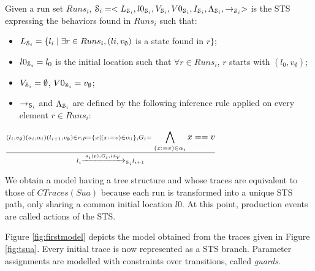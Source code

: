 \begin{definition}
  Given a run set $Runs_i$, $\EuScript{S}_i=<L_{\EuScript{S}_i},
  l0_{\EuScript{S}_i},V_{\EuScript{S}_i}, V0_{\EuScript{S}_i},
  I_{\EuScript{S}_i},\\
  \Lambda_{\EuScript{S}_i},\rightarrow_{\EuScript{S}_i}>$ is the
  STS expressing the behaviors found in $Runs_i$ such that:

	\begin{itemize}
    \item $L_{\EuScript{S}_i}= \{l_i \mid \exists r\in Runs_i,
      (li,v_\emptyset)$ is a state found in $r\}$;

    \item $l0_{\EuScript{S}_i} = l_0$ is the initial location
      such that $\forall r \in Runs_i$, $r$ starts with
      $(l_0,v_\emptyset)$;

    \item $V_{\EuScript{S}_i}=\emptyset$, $V0_{\EuScript{S}_i}=v_\emptyset$;

    \item $\rightarrow_{\EuScript{S}_i}$ and
      $\Lambda_{\EuScript{S}_i}$ are defined by the following
      inference rule applied on every element $r\in Runs_i$:
	\end{itemize}

  \begin{center}
    {\Large
    $\frac{(l_i,v_\emptyset) (a_i,\alpha_i) (l_{i+1},v_\emptyset)
    \in r, p=\{x \mid (x:=v)\in \alpha_i \}, G_i=\displaystyle
  \bigwedge_{(x:=v)\in \alpha_i}x==v}{l_i \xrightarrow{a_i(p),G_i,id_V}_{\EuScript{S}_i} l_{i+1}}$
    }
  \end{center}


  \label{IOSTS_tree}
\end{definition}

We obtain a model having a tree structure and whose traces are
equivalent to those of $CTraces(Sua)$ because each run is
transformed into a unique STS path, only sharing a common initial
location $l0$. At this point, production events are called
actions of the STS.


Figure \ref{fig:firstmodel} depicts the model obtained from the
traces given in Figure \ref{fig:tsua}. Every initial trace is now
represented as a STS branch. Parameter assignments are modelled
with constraints over transitions, called \textit{guards}.


